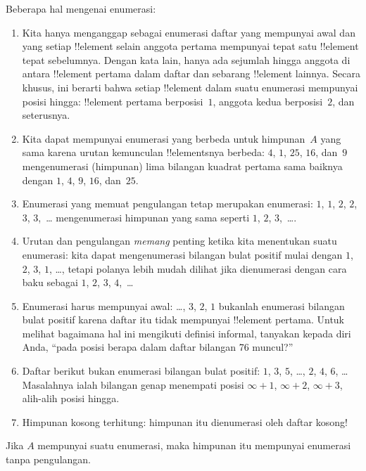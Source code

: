 \documentclass[../../../include/open-logic-section]{subfiles}
\begin{document}
\begin{explain}
Beberapa hal mengenai enumerasi:
\begin{enumerate}
\item Kita hanya menganggap sebagai enumerasi daftar yang mempunyai awal dan
  yang setiap !!{element} selain anggota pertama mempunyai tepat satu
  !!{element} tepat sebelumnya. Dengan kata lain, hanya ada sejumlah hingga
  anggota di antara !!{element} pertama dalam daftar dan sebarang
  !!{element} lainnya. Secara khusus, ini berarti bahwa setiap !!{element}
  dalam suatu enumerasi mempunyai posisi hingga: !!{element} pertama
  berposisi~$1$, anggota kedua berposisi~$2$, dan seterusnya.
\item Kita dapat mempunyai enumerasi yang berbeda untuk himpunan~$A$ yang sama
  karena urutan kemunculan !!{element}snya berbeda: $4$, $1$, $25$, $16$,
  dan~$9$ mengenumerasi (himpunan) lima bilangan kuadrat pertama sama baiknya
  dengan $1$, $4$, $9$, $16$, dan~$25$.
\item Enumerasi yang memuat pengulangan tetap merupakan enumerasi: $1$, $1$,
  $2$, $2$, $3$, $3$,~\dots{} mengenumerasi himpunan yang sama seperti $1$,
  $2$, $3$,~\dots{}.
\item Urutan dan pengulangan \emph{memang} penting ketika kita menentukan suatu
  enumerasi: kita dapat mengenumerasi bilangan bulat positif mulai dengan
  $1$, $2$, $3$, $1$, \dots{}, tetapi polanya lebih mudah dilihat jika
  dienumerasi dengan cara baku sebagai $1$, $2$, $3$, $4$,~\dots
\item Enumerasi harus mempunyai awal: \dots, $3$, $2$, $1$ bukanlah enumerasi
  bilangan bulat positif karena daftar itu tidak mempunyai !!{element}
  pertama. Untuk melihat bagaimana hal ini mengikuti definisi informal,
  tanyakan kepada diri Anda, ``pada posisi berapa dalam daftar bilangan 76
  muncul?''
\item Daftar berikut bukan enumerasi bilangan bulat positif: $1$, $3$, $5$,
  \dots, $2$, $4$, $6$, \dots\@ Masalahnya ialah bilangan genap menempati
  posisi $\infty + 1$, $\infty + 2$, $\infty + 3$, alih-alih posisi hingga.
\item Himpunan kosong terhitung: himpunan itu dienumerasi oleh daftar kosong!{}
\end{enumerate}
\end{explain}

\begin{prop}
Jika $A$ mempunyai suatu enumerasi, maka himpunan itu mempunyai enumerasi tanpa
  pengulangan.
\end{prop}
\end{document}
